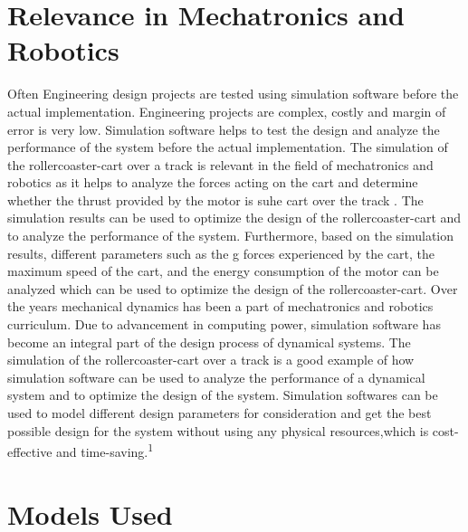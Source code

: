 \documentclass{article}
\begin{document}
    \section{Relevance in Mechatronics and Robotics}
    Often Engineering design projects are tested using simulation software
    before the actual implementation. Engineering projects are complex, costly
    and margin of error is very low. Simulation software helps to test the design
    and analyze the performance of the system before the actual implementation.
    The simulation of the rollercoaster-cart over a track is relevant in the
    field of mechatronics and robotics as it helps to analyze the forces acting
    on the cart and determine whether the thrust provided by the motor is suhe
    cart over the track . The simulation results can be used to optimize the
    design of the rollercoaster-cart and to analyze the performance of the
    system. Furthermore, based on the simulation results, different parameters such
    as the g forces experienced by the cart, the maximum speed of the cart, and the
    energy consumption of the motor can be analyzed which can be used to optimize
    the design of the rollercoaster-cart. Over the years mechanical dynamics has
    been a part of mechatronics and robotics curriculum. Due to advancement in computing
    power, simulation software has become an integral part of the design process
    of dynamical systems. The simulation of the rollercoaster-cart over a track is
    a good example of how simulation software can be used to analyze the performance
    of a dynamical system and to optimize the design of the system. Simulation
    softwares can be used to model different design parameters for consideration
    and get the best possible design for the system without using any physical
    resources,which is cost-effective and time-saving.\textsuperscript{1}

    \section{Models Used}
\end{document}
